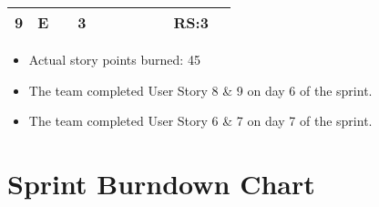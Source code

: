 \documentclass[12pt]{article}
\begin{document}
\begin{table}[H]
\begin{tabular}{@{}c|c|c|c|ccccccc@{}}
9     & E    &            & 3                                                      &                                                 &                                                 &                                                  &                                                  &                                                  &  RS:3                                                &                                                  \\ \bottomrule
\end{tabular}
\end{table}
\begin{itemize}%
\item Actual story points burned: 45
\item The team completed User Story 8 \& 9 on day 6 of the sprint. 
\item The team completed User Story 6 \& 7 on day 7 of the sprint. 
\end{itemize}

\section{Sprint Burndown Chart}


\newpage


\end{document}
